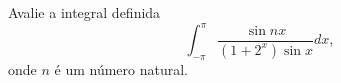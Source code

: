 Avalie a integral definida
\[\int_{-\pi}^{\pi}\frac{\sin nx}{(1+2^{x})\sin x} dx,\] onde \(n\) é um número natural.
